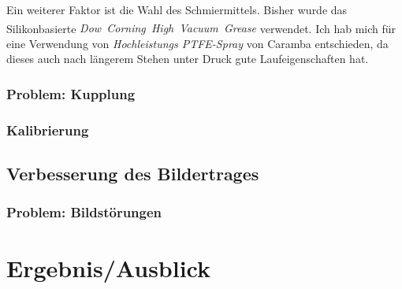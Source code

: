 \documentclass[
    11pt,
    ngerman
]{scrreprt}
\begin{document}
Ein weiterer Faktor ist die Wahl des Schmiermittels. Bisher wurde das
Silikonbasierte \emph{Dow~Corning\textsuperscript{\textregistered}~High~Vacuum~Grease} verwendet. Ich
hab mich für eine Verwendung von \emph{Hochleistungs
\textsc{PTFE}-Spray} von Caramba entschieden, da dieses auch nach
längerem Stehen unter Druck gute Laufeigenschaften hat.


\subsection{Problem: Kupplung}

\subsection{Kalibrierung}

\section{Verbesserung des Bildertrages}

\subsection{Problem: Bildstörungen}

\chapter{Ergebnis/Ausblick}
\end{document}
